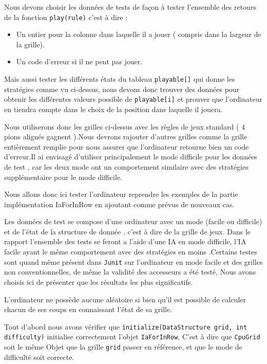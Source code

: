 


 Nous devons choisir les données de tests de façon à tester l'ensemble des retours de la fonction \texttt{play(rule)}
c'est à dire :
\begin{itemize}
 \item Un entier pour la colonne dans laquelle il a jouer ( compris dans la largeur de la grille).
 \item Un code d'erreur si il ne peut pas jouer.
\end{itemize}

Mais aussi tester les différents états du tableau \texttt{playable[]} qui donne les stratégies comme vu ci-dessus, nous devons donc trouver des données pour obtenir les différentes valeurs possible de \texttt{playable[i]} et prouver que l'ordinateur en tiendra compte dans le choix de la position dans laquelle il jouera.

Nous utiliserons donc les grilles ci-dessus avec les règles de jeux standard ( 4 pions alignés gagnent ).Nous devrons rajouter d'autres grilles comme la grille entièrement remplie pour nous assurer que l'ordinateur retourne bien un code d'erreur.Il ai envisagé d'utiliser principalement le mode difficile pour les données de test , car les deux mode ont un comportement similaire avec des stratégies supplémentaire pour le mode difficile.


Nous allons donc ici tester l'ordinateur reprendre les exemples de la partie implémentation IaForInRow en ajoutant comme prévus de nouveaux cas.

Les données de test se compose d'une ordinateur avec un mode (facile ou difficile) et de l'état de la structure de donnée , c'est à dire de la grille de jeux. Dans le rapport l'ensemble des tests se feront a l'aide d'une IA en mode difficile, l'IA facile ayant le même comportement avec des stratégies en moins .Certains testes sont quand même présent dans \texttt{Junit} sur l'ordinateur en mode facile et des grilles non conventionnelles, de même la validité des accesseurs a été testé, Nous avons choisis ici de présenter que les résultats les plus  significatifs.

L'ordinateur ne possède aucune aléatoire si bien qu'il est possible de calculer chacun de ses coups en connaissant l'état de sa grille.


Tout d'abord nous avons vérifier que \texttt{initialize(DataStructure grid, int difficulty)} initialise correctement l'objet \texttt{IaForInRow}, C'est à dire que \texttt{CpuGrid} soit le même Objet que la grille \texttt{grid} passer en référence, et que le mode de difficulté soit correcte.

